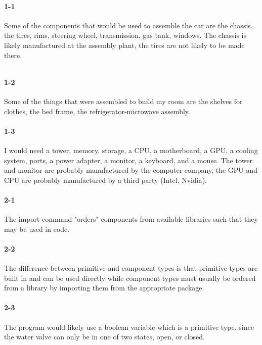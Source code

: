 \documentclass[10pt]{article}
\begin{document}
\maketitle


\paragraph{1-1}
Some of the components that would be used to assemble the car are the chassis, the tires, rims, steering wheel, transmission, gas tank, windows. The chassis is likely manufactured at the assembly plant, the tires are not likely to be made there. 
\begin{lstlisting}
\end{lstlisting}
\paragraph{1-2}
Some of the things that were assembled to build my room are the shelves for clothes, the bed frame, the refrigerator-microwave assembly. 

\paragraph{1-3}
I would need a tower, memory, storage, a CPU, a motherboard, a GPU, a cooling system, ports, a power adapter, a monitor, a keyboard, and a mouse. The tower and monitor are probably manufactured by the computer company, the GPU and CPU are probably manufactured by a third party (Intel, Nvidia). 

\paragraph{2-1}
The import command "orders" components from available libraries such that they may be used in code. 

\paragraph{2-2}
The difference between primitive and component types is that primitive types are built in and can be used directly while component types must usually be ordered from a  library by importing them from the appropriate package. 

\paragraph{2-3} The program would likely use a boolean variable which is a primitive type, since the water valve can only be in one of two states, open, or closed. 
\end{document}
